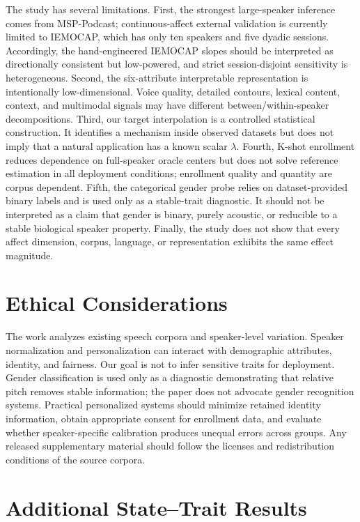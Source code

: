 \documentclass[11pt]{article}
\begin{document}
The study has several limitations.
First, the strongest large-speaker inference comes from MSP-Podcast; continuous-affect external validation is currently limited to IEMOCAP, which has only ten speakers and five dyadic sessions.
Accordingly, the hand-engineered IEMOCAP slopes should be interpreted as directionally consistent but low-powered, and strict session-disjoint sensitivity is heterogeneous.
Second, the six-attribute interpretable representation is intentionally low-dimensional.
Voice quality, detailed contours, lexical content, context, and multimodal signals may have different between/within-speaker decompositions.
Third, our target interpolation is a controlled statistical construction.
It identifies a mechanism inside observed datasets but does not imply that a natural application has a known scalar $\lambda$.
Fourth, K-shot enrollment reduces dependence on full-speaker oracle centers but does not solve reference estimation in all deployment conditions; enrollment quality and quantity are corpus dependent.
Fifth, the categorical gender probe relies on dataset-provided binary labels and is used only as a stable-trait diagnostic.
It should not be interpreted as a claim that gender is binary, purely acoustic, or reducible to a stable biological speaker property.
Finally, the study does not show that every affect dimension, corpus, language, or representation exhibits the same effect magnitude.

\section*{Ethical Considerations}

The work analyzes existing speech corpora and speaker-level variation.
Speaker normalization and personalization can interact with demographic attributes, identity, and fairness.
Our goal is not to infer sensitive traits for deployment.
Gender classification is used only as a diagnostic demonstrating that relative pitch removes stable information; the paper does not advocate gender recognition systems.
Practical personalized systems should minimize retained identity information, obtain appropriate consent for enrollment data, and evaluate whether speaker-specific calibration produces unequal errors across groups.
Any released supplementary material should follow the licenses and redistribution conditions of the source corpora.



\appendix

\section{Additional State--Trait Results}
\end{document}
